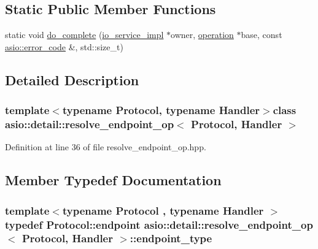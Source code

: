 \subsection*{Static Public Member Functions}
\begin{DoxyCompactItemize}
\item 
static void \hyperlink{classasio_1_1detail_1_1resolve__endpoint__op_afa1420972e2bfd29dfcbc43f8b542b90}{do\+\_\+complete} (\hyperlink{namespaceasio_1_1detail_a6d61d9b8e53c11288be549d82aec5a42}{io\+\_\+service\+\_\+impl} $\ast$owner, \hyperlink{namespaceasio_1_1detail_a338968609bec20e37145309f8f9ec936}{operation} $\ast$base, const \hyperlink{classasio_1_1error__code}{asio\+::error\+\_\+code} \&, std\+::size\+\_\+t)
\end{DoxyCompactItemize}


\subsection{Detailed Description}
\subsubsection*{template$<$typename Protocol, typename Handler$>$class asio\+::detail\+::resolve\+\_\+endpoint\+\_\+op$<$ Protocol, Handler $>$}



Definition at line 36 of file resolve\+\_\+endpoint\+\_\+op.\+hpp.



\subsection{Member Typedef Documentation}
\hypertarget{classasio_1_1detail_1_1resolve__endpoint__op_ac3d7acefa9c9de9b1a9c159b5406a3ed}{}
\subsubsection[{endpoint\+\_\+type}]{\setlength{\rightskip}{0pt plus 5cm}template$<$typename Protocol , typename Handler $>$ typedef Protocol\+::endpoint {\bf asio\+::detail\+::resolve\+\_\+endpoint\+\_\+op}$<$ Protocol, Handler $>$\+::{\bf endpoint\+\_\+type}}\label{classasio_1_1detail_1_1resolve__endpoint__op_ac3d7acefa9c9de9b1a9c159b5406a3ed}


